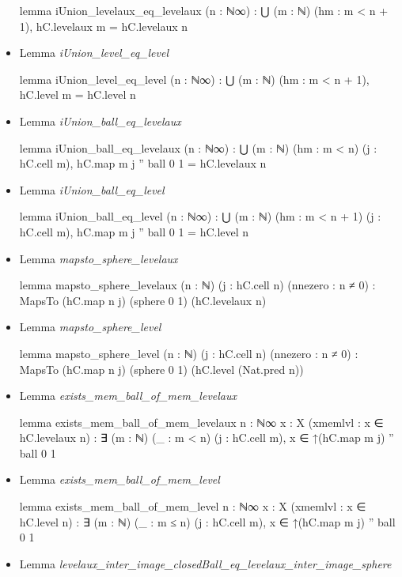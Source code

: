\documentclass[colorinlistoftodos]{article}
\begin{document}
\begin{itemize}
\begin{leancode}
lemma iUnion_levelaux_eq_levelaux (n : ℕ∞) :
  ⋃ (m : ℕ) (hm : m < n + 1), hC.levelaux m = hC.levelaux n
\end{leancode}
  \item Lemma \emph{iUnion\_level\_eq\_level}
\begin{leancode}
lemma iUnion_level_eq_level (n : ℕ∞) : ⋃ (m : ℕ) (hm : m < n + 1), hC.level m = hC.level n
\end{leancode}
  \item Lemma \emph{iUnion\_ball\_eq\_levelaux}
\begin{leancode}
lemma iUnion_ball_eq_levelaux (n : ℕ∞) :
  ⋃ (m : ℕ) (hm : m < n) (j : hC.cell m), hC.map m j '' ball 0 1 = hC.levelaux n
\end{leancode}
  \item Lemma \emph{iUnion\_ball\_eq\_level}
\begin{leancode}
lemma iUnion_ball_eq_level (n : ℕ∞) :
  ⋃ (m : ℕ) (hm : m < n + 1) (j : hC.cell m), hC.map m j '' ball 0 1 = hC.level n
\end{leancode}
  \item Lemma \emph{mapsto\_sphere\_levelaux}
\begin{leancode}
lemma mapsto_sphere_levelaux (n : ℕ) (j : hC.cell n) (nnezero : n ≠ 0) :
  MapsTo (hC.map n j) (sphere 0 1) (hC.levelaux  n)
\end{leancode}
  \item Lemma \emph{mapsto\_sphere\_level}
\begin{leancode}
lemma mapsto_sphere_level (n : ℕ) (j : hC.cell n) (nnezero : n ≠ 0) :
  MapsTo (hC.map n j) (sphere 0 1) (hC.level (Nat.pred n))
\end{leancode}
  \item Lemma \emph{exists\_mem\_ball\_of\_mem\_levelaux}
\begin{leancode}
lemma exists_mem_ball_of_mem_levelaux {n : ℕ∞} {x : X} (xmemlvl : x ∈ hC.levelaux n) :
  ∃ (m : ℕ) (_ : m < n) (j : hC.cell m), x ∈ ↑(hC.map m j) '' ball 0 1
\end{leancode}
  \item Lemma \emph{exists\_mem\_ball\_of\_mem\_level}
\begin{leancode}
lemma exists_mem_ball_of_mem_level {n : ℕ∞} {x : X} (xmemlvl : x ∈ hC.level n) :
  ∃ (m : ℕ) (_ : m ≤ n) (j : hC.cell m), x ∈ ↑(hC.map m j) '' ball 0 1
\end{leancode}
  \item Lemma \emph{levelaux\_inter\_image\_closedBall\_eq\_levelaux\_inter\_image\_sphere}

\end{itemize}
\end{document}
